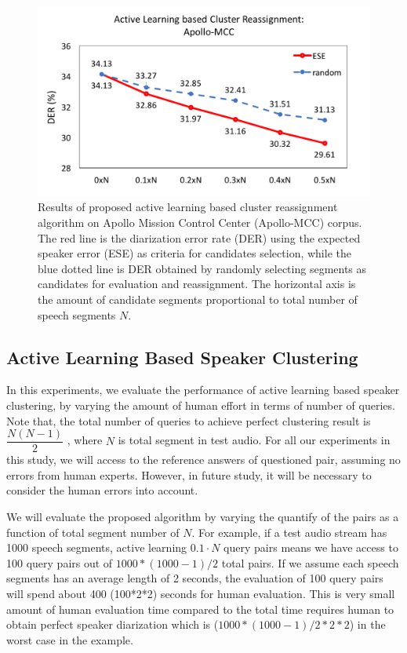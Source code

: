 \documentclass[journal]{IEEEtran}
\begin{document}
\begin{figure}
	\includegraphics[width=\linewidth]{figs/exp2_1}
	\caption{Results of proposed active learning based cluster reassignment algorithm on Apollo Mission Control Center (Apollo-MCC) corpus. The red line is the diarization error rate (DER) using the expected speaker error (ESE) as criteria for candidates selection, while the blue dotted line is DER obtained by randomly selecting segments as candidates for evaluation and reassignment. The horizontal axis is the amount of candidate segments proportional to total number of speech segments $N$.}
	\label{exp2_2}
\end{figure}
\subsection{Active Learning Based Speaker Clustering}
In this experiments, we evaluate the performance of active learning based speaker clustering, by varying the amount of human effort in terms of number of queries. Note that, the total number of queries to achieve perfect clustering result is $\dfrac{N(N-1)}{2}$ , where $N$ is total segment in test audio.
For all our experiments in this study, we will access to the reference answers of questioned pair, assuming no errors from human experts. However, in future study, it will be necessary to consider the human errors into account.

We will evaluate the proposed algorithm by varying the quantify of the pairs as a function of total segment number of $N$. For example, if a test audio stream has 1000 speech segments, active learning $0.1\cdot N$ query pairs means we have access to 100 query pairs out of $1000*(1000-1)/2$ total pairs. If we assume each speech segments has an average length of 2 seconds, the evaluation of 100 query pairs will spend about 400 (100*2*2) seconds for human evaluation. This is very small amount of human evaluation time compared to the total time requires human to obtain perfect speaker diarization which is ($1000*(1000-1)/2*2*2$) in the worst case in the example.
\end{document}
